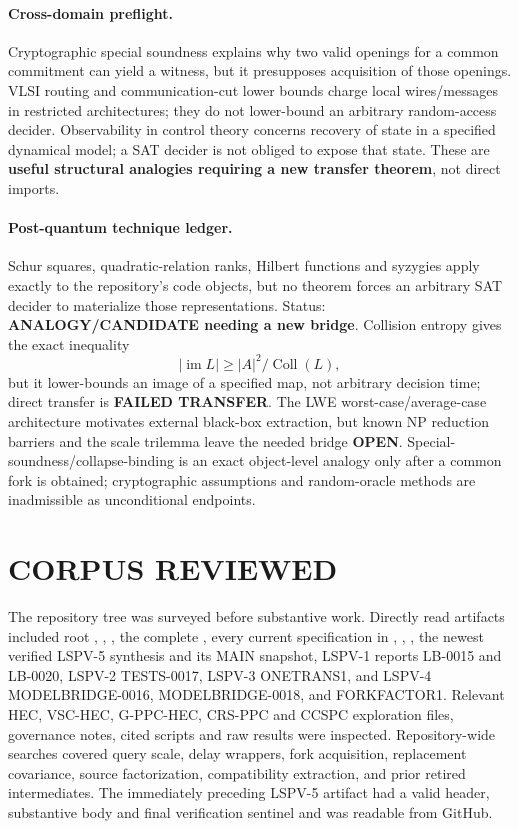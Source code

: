 \documentclass[11pt]{article}
\begin{document}
\paragraph{Cross-domain preflight.}
Cryptographic special soundness explains why two valid openings for a
common commitment can yield a witness, but it presupposes acquisition of
those openings.  VLSI routing and communication-cut lower bounds charge
local wires/messages in restricted architectures; they do not lower-bound
an arbitrary random-access decider.  Observability in control theory
concerns recovery of state in a specified dynamical model; a SAT decider is
not obliged to expose that state.  These are \textbf{useful structural
analogies requiring a new transfer theorem}, not direct imports.

\paragraph{Post-quantum technique ledger.}
Schur squares, quadratic-relation ranks, Hilbert functions and syzygies
apply exactly to the repository's code objects, but no theorem forces an
arbitrary SAT decider to materialize those representations.  Status:
\textbf{ANALOGY/CANDIDATE needing a new bridge}.  Collision entropy gives
the exact inequality
\[
        |\operatorname{im}L|\ge |A|^2/\operatorname{Coll}(L),
\]
but it lower-bounds an image of a specified map, not arbitrary decision
time; direct transfer is \textbf{FAILED TRANSFER}.  The LWE
worst-case/average-case architecture motivates external black-box
extraction, but known NP reduction barriers and the scale trilemma leave the
needed bridge \textbf{OPEN}.  Special-soundness/collapse-binding is an exact
object-level analogy only after a common fork is obtained; cryptographic
assumptions and random-oracle methods are inadmissible as unconditional
endpoints.

\section{CORPUS REVIEWED}

The repository tree was surveyed before substantive work.  Directly read
artifacts included root , ,
, the complete
, every current specification in
, , , the newest verified
LSPV-5 synthesis
and its MAIN snapshot, LSPV-1 reports LB-0015 and LB-0020, LSPV-2
TESTS-0017, LSPV-3 ONETRANS1, and LSPV-4 MODELBRIDGE-0016,
MODELBRIDGE-0018, and FORKFACTOR1.  Relevant HEC, VSC-HEC, G-PPC-HEC,
CRS-PPC and CCSPC exploration files, governance notes, cited scripts and raw
results were inspected.  Repository-wide searches covered query scale,
delay wrappers, fork acquisition, replacement covariance, source
factorization, compatibility extraction, and prior retired intermediates.
The immediately preceding LSPV-5 artifact had a valid header, substantive
body and final verification sentinel and was readable from GitHub.
\end{document}
